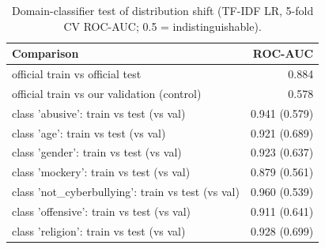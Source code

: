 \begin{table}[t]
\centering
\small
\caption{Domain-classifier test of distribution shift (TF-IDF LR, 5-fold CV ROC-AUC; 0.5 = indistinguishable).}
\label{tab:tab03b_split_shift}
\begin{tabular}{lr}
\toprule
Comparison & ROC-AUC \\
\midrule
official train vs official test & 0.884 \\
official train vs our validation (control) & 0.578 \\
class 'abusive': train vs test (vs val) & 0.941 (0.579) \\
class 'age': train vs test (vs val) & 0.921 (0.689) \\
class 'gender': train vs test (vs val) & 0.923 (0.637) \\
class 'mockery': train vs test (vs val) & 0.879 (0.561) \\
class 'not\_cyberbullying': train vs test (vs val) & 0.960 (0.539) \\
class 'offensive': train vs test (vs val) & 0.911 (0.641) \\
class 'religion': train vs test (vs val) & 0.928 (0.699) \\
\bottomrule
\end{tabular}
\end{table}
